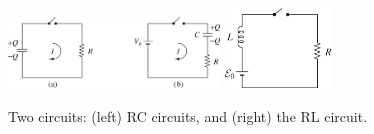 \documentclass[12pt]{article}
\begin{document}
\begin{figure}
\centering
\includegraphics[width=0.5\textwidth]{figures/7_5.jpg} \hspace{1cm}
\includegraphics[width=0.25\textwidth]{figures/7_35.jpg}
\caption{\label{fig:1} Two circuits: (left) RC circuits, and (right) the RL circuit.}
\end{figure}
\end{document}

